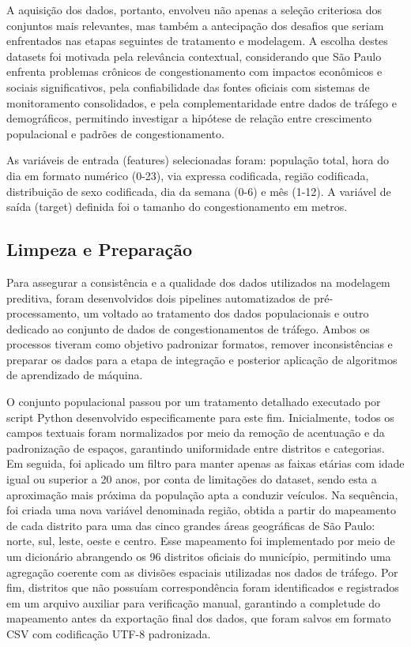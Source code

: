 \documentclass[conference]{IEEEtran}
\begin{document}
A aquisição dos dados, portanto, envolveu não apenas a seleção criteriosa dos conjuntos mais relevantes, mas também a antecipação dos desafios que seriam enfrentados nas etapas seguintes de tratamento e modelagem. A escolha destes datasets foi motivada pela relevância contextual, considerando que São Paulo enfrenta problemas crônicos de congestionamento com impactos econômicos e sociais significativos, pela confiabilidade das fontes oficiais com sistemas de monitoramento consolidados, e pela complementaridade entre dados de tráfego e demográficos, permitindo investigar a hipótese de relação entre crescimento populacional e padrões de congestionamento.

As variáveis de entrada (features) selecionadas foram: população total, hora do dia em formato numérico (0-23), via expressa codificada, região codificada, distribuição de sexo codificada, dia da semana (0-6) e mês (1-12). A variável de saída (target) definida foi o tamanho do congestionamento em metros.

\subsection{Limpeza e Preparação}

Para assegurar a consistência e a qualidade dos dados utilizados na modelagem preditiva, foram desenvolvidos dois pipelines automatizados de pré-processamento, um voltado ao tratamento dos dados populacionais e outro dedicado ao conjunto de dados de congestionamentos de tráfego. Ambos os processos tiveram como objetivo padronizar formatos, remover inconsistências e preparar os dados para a etapa de integração e posterior aplicação de algoritmos de aprendizado de máquina.

O conjunto populacional passou por um tratamento detalhado executado por script Python desenvolvido especificamente para este fim. Inicialmente, todos os campos textuais foram normalizados por meio da remoção de acentuação e da padronização de espaços, garantindo uniformidade entre distritos e categorias. Em seguida, foi aplicado um filtro para manter apenas as faixas etárias com idade igual ou superior a 20 anos, por conta de limitações do dataset, sendo esta a aproximação mais próxima da população apta a conduzir veículos. Na sequência, foi criada uma nova variável denominada região, obtida a partir do mapeamento de cada distrito para uma das cinco grandes áreas geográficas de São Paulo: norte, sul, leste, oeste e centro. Esse mapeamento foi implementado por meio de um dicionário abrangendo os 96 distritos oficiais do município, permitindo uma agregação coerente com as divisões espaciais utilizadas nos dados de tráfego. Por fim, distritos que não possuíam correspondência foram identificados e registrados em um arquivo auxiliar para verificação manual, garantindo a completude do mapeamento antes da exportação final dos dados, que foram salvos em formato CSV com codificação UTF-8 padronizada.
\end{document}
